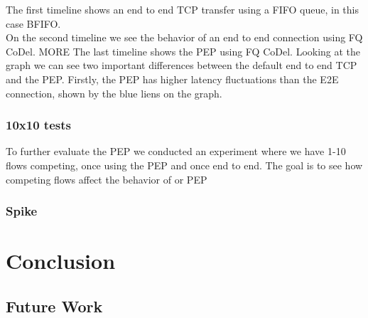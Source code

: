 \documentclass[a4paper,english, 11pt]{report}
\begin{document}
The first timeline shows an end to end TCP transfer using a FIFO queue, in this case BFIFO.\\ 
On the second timeline we see the behavior of an end to end connection using FQ CoDel. {MORE}
The last timeline shows the PEP using FQ CoDel. Looking at the graph we can see two important differences between the default end to end TCP and the PEP. Firstly, the PEP has higher latency fluctuations than the E2E connection, shown by the blue liens on the graph. 


\subsection{10x10 tests}
To further evaluate the PEP we conducted an experiment where we have 1-10 flows competing, once using the PEP and once end to end. The goal is to see how competing flows affect the behavior of or PEP

\subsection{Spike}

\chapter{Conclusion}

\section{Future Work}

{}

\end{document}
